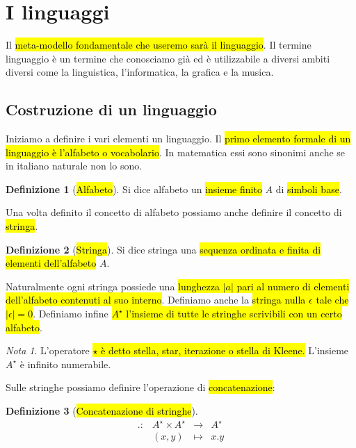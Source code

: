 \documentclass[a4paper,11pt,oneside]{article}
\theoremstyle{plain}
\theoremstyle{definition}
\newtheorem{defn}{Definizione}[section]
\theoremstyle{remark}
\newtheorem*{nota}{Nota}
\begin{document}
\section{I linguaggi}\label{sec:linguaggi}

Il \hl{meta-modello fondamentale che useremo sarà il linguaggio}. Il termine
linguaggio è un termine che conosciamo già ed è utilizzabile a diversi ambiti
diversi come la linguistica, l'informatica, la grafica e la musica.

\subsection{Costruzione di un linguaggio}\label{sec:linguaggi-costruzione}

Iniziamo a definire i vari elementi un linguaggio. Il \hl{primo elemento formale
di un linguaggio è l'alfabeto o vocabolario}. In matematica essi sono sinonimi
anche se in italiano naturale non lo sono.

\begin{defn}[\hl{Alfabeto}]\label{def:alfabeto}
  Si dice alfabeto un \hl{insieme finito} $A$ di \hl{simboli base}.
\end{defn}

Una volta definito il concetto di alfabeto possiamo anche definire il concetto
di \hl{stringa}.

\begin{defn}[\hl{Stringa}]\label{def:stringa}
  Si dice stringa una \hl{sequenza ordinata e finita di elementi dell'alfabeto}
  $A$.
\end{defn}

Naturalmente ogni stringa possiede una \hl{lunghezza $|a|$ pari al numero di
elementi dell'alfabeto contenuti al suo interno}. Definiamo anche la \hl{stringa
nulla $\epsilon$ tale che $|\epsilon|=0$}. Definiamo infine \hl{$A^\star$
l'insieme di tutte le stringhe scrivibili con un certo alfabeto}.

\begin{nota}
  L'operatore \hl{$\star$ è detto stella, star, iterazione o stella di Kleene.}
  L'insieme $A^\star$ è infinito numerabile.
\end{nota}

Sulle stringhe possiamo definire l'operazione di \hl{concatenazione}:

\begin{defn}[\hl{Concatenazione di stringhe}]\label{def:concatenazione-stringhe}
  \begin{equation}
    \begin{array}{cccc}
      . : & A^\star \times A^\star & \to & A^\star \\
          & (x, y) & \mapsto & x.y
    \end{array}
  \end{equation}
\end{defn}
\end{document}
